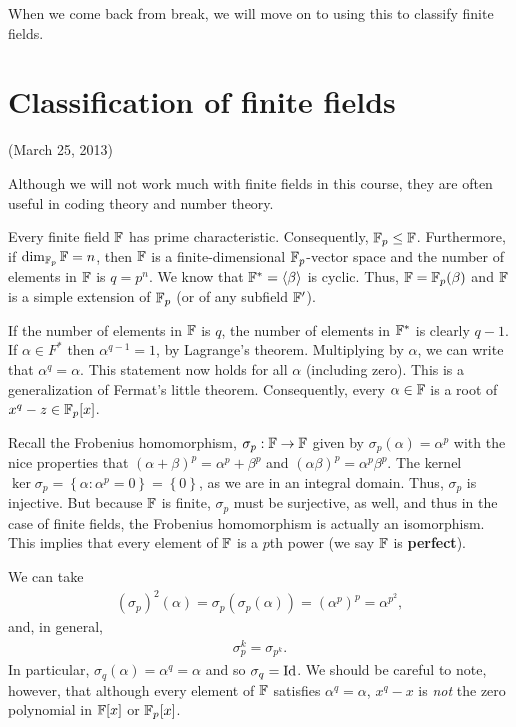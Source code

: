 \documentclass{../mathnotes}
\begin{document}
When we come back from break, we will move on to using this to classify finite fields.

\section{Classification of finite fields}

(March 25, 2013)

Although we will not work much with finite fields in this course, they are often useful in coding theory and number theory.

Every finite field $\mathbb{F}$ has prime characteristic. Consequently, $\mathbb{F}_p\leq \mathbb{F}$. Furthermore,
if $\dim_{\mathbb{F}_p}\mathbb{F}=n$, then $\mathbb{F}$ is a finite-dimensional $\mathbb{F}_p$-vector space and the number of elements
in $\mathbb{F}$ is $q=p^n$. We know that $\mathbb{F}^*=\langle\beta\rangle$ is cyclic. Thus, $\mathbb{F}=\mathbb{F}_p(\beta)$ and
$\mathbb{F}$ is a simple extension of $\mathbb{F}_p$ (or of any subfield $\mathbb{F}'$).

If the number of elements in $\mathbb{F}$ is $q$, the number of elements in $\mathbb{F}^*$ is clearly $q-1$. If $\alpha\in F^*$ then
$\alpha^{q-1}=1$, by Lagrange's theorem. Multiplying by $\alpha$, we can write that $\alpha^q=\alpha$. This statement now holds
for all $\alpha$ (including zero). This is a generalization of Fermat's little theorem. Consequently, every $\alpha\in\mathbb{F}$ is a root of $x^q-z\in\mathbb{F}_p[x]$.

Recall the Frobenius homomorphism, $\sigma_p:\mathbb{F}\to\mathbb{F}$ given by $\sigma_p(\alpha)=\alpha^p$ with the nice properties that $(\alpha+\beta)^p=\alpha^p+\beta^p$
and $(\alpha\beta)^p=\alpha^p\beta^p$. The kernel $\ker\sigma_p=\left\{ \alpha:\alpha^p=0 \right\}=\left\{ 0 \right\}$, as we are in an integral domain.
Thus, $\sigma_p$ is injective. But because $\mathbb{F}$ is finite, $\sigma_p$ must be surjective, as well, and thus in the case of finite fields, the Frobenius homomorphism
is actually an isomorphism. This implies that every element of $\mathbb{F}$ is a $p$th power (we say $\mathbb{F}$ is \textbf{perfect}).

We can take
\begin{align*}
    (\sigma_p)^2(\alpha)=\sigma_p(\sigma_p(\alpha))=(\alpha^p)^p=\alpha^{p^2},
\end{align*}
and, in general,
\begin{align*}
    \sigma_p^k=\sigma_{p^k}.
\end{align*}
In particular, $\sigma_q(\alpha)=\alpha^q=\alpha$ and so $\sigma_q=\operatorname{Id}$.
We should be careful to note, however, that although every element of $\mathbb{F}$ satisfies $\alpha^q=\alpha$, $x^q-x$ is \textit{not} the zero polynomial
in $\mathbb{F}[x]$ or $\mathbb{F}_p[x]$.
\end{document}
